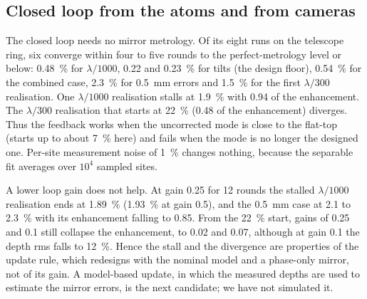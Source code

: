 \documentclass[11pt]{article}
\begin{document}
\subsection{Closed loop from the atoms and from cameras}

The closed loop needs no mirror metrology. Of its eight runs on the telescope ring, six converge
within four to five rounds to the perfect-metrology level or below: \SI{0.48}{\percent} for
$\lambda/1000$, 0.22 and \SI{0.23}{\percent} for tilts (the design floor), \SI{0.54}{\percent} for the
combined case, \SI{2.3}{\percent} for \SI{0.5}{\milli\metre} errors and \SI{1.5}{\percent} for the first
$\lambda/300$ realisation. One $\lambda/1000$ realisation stalls at \SI{1.9}{\percent} with 0.94 of the
enhancement. The $\lambda/300$ realisation that starts at \SI{22}{\percent} (0.48 of the enhancement)
diverges. Thus the feedback works when the uncorrected mode is close to the flat-top (starts up to
about \SI{7}{\percent} here) and fails when the mode is no longer the designed one. Per-site
measurement noise of \SI{1}{\percent} changes nothing, because the separable fit averages over $10^{4}$
sampled sites.

A lower loop gain does not help. At gain 0.25 for 12 rounds the stalled $\lambda/1000$ realisation
ends at \SI{1.89}{\percent} (\SI{1.93}{\percent} at gain 0.5), and the \SI{0.5}{\milli\metre} case at 2.1
to \SI{2.3}{\percent} with its enhancement falling to 0.85. From the \SI{22}{\percent} start, gains of
0.25 and 0.1 still collapse the enhancement, to 0.02 and 0.07, although at gain 0.1 the depth rms falls
to \SI{12}{\percent}. Hence the stall and the divergence are properties of the update rule, which
redesigns with the nominal model and a phase-only mirror, not of its gain. A model-based update, in
which the measured depths are used to estimate the mirror errors, is the next candidate; we have not
simulated it.
\end{document}
